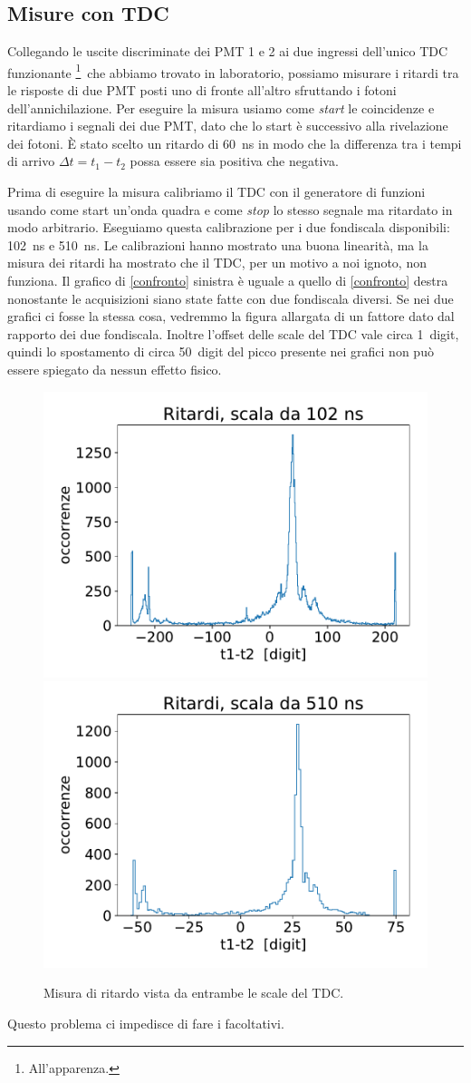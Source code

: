 \subsection{Misure con TDC}

Collegando le uscite discriminate dei PMT 1 e 2 ai due ingressi dell'unico TDC funzionante%
\footnote{All'apparenza.}%
\,che abbiamo trovato in laboratorio, possiamo misurare i ritardi tra le risposte di due PMT posti uno di fronte all'altro sfruttando i fotoni dell'annichilazione. Per eseguire la misura usiamo come \emph{start} le coincidenze e ritardiamo i segnali dei due PMT, dato che lo start è successivo alla rivelazione dei fotoni. \`E stato scelto un ritardo di \SI{60}{ns} in modo che la differenza tra i tempi di arrivo $\Delta t=t_1-t_2$ possa essere sia positiva che negativa.


Prima di eseguire la misura calibriamo il TDC con il generatore di funzioni usando come start un'onda quadra e come \emph{stop} lo stesso segnale ma ritardato in modo arbitrario.
Eseguiamo questa calibrazione per i due fondiscala disponibili: \SI{102}{ns} e \SI{510}{ns}.
Le calibrazioni hanno mostrato una buona linearità, ma la misura dei ritardi ha mostrato che il TDC, per un motivo a noi ignoto, non funziona.
Il grafico di \autoref{confronto} sinistra è uguale a quello di \autoref{confronto} destra nonostante le acquisizioni siano state fatte con due fondiscala diversi. Se nei due grafici ci fosse la stessa cosa, vedremmo la figura allargata di un fattore dato dal rapporto dei due fondiscala. Inoltre l'offset delle scale del TDC vale circa \SI{1}{digit}, quindi lo spostamento di circa \SI{50}{digit} del picco presente nei grafici non può essere spiegato da nessun effetto fisico.

\begin{figure}[h]
\centering
\subfloat
{\includegraphics[width=18 em]{immagini/100}
}
\subfloat
{\includegraphics[width=18 em]{immagini/500}
}

\caption{Misura di ritardo vista da entrambe le scale del TDC.}
\label{confronto}
\end{figure}

Questo problema ci impedisce di fare i facoltativi.